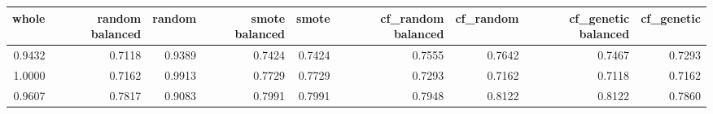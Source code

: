 \begin{tabular}{rrrrrrrrr}
\toprule

 whole &  random balanced &  random &  smote balanced &  smote &  cf\_random balanced &  cf\_random &  cf\_genetic balanced &  cf\_genetic \\
\midrule

0.9432 &           0.7118 &  0.9389 &          0.7424 & 0.7424 &              0.7555 &     0.7642 &               0.7467 &      0.7293 \\
1.0000 &           0.7162 &  0.9913 &          0.7729 & 0.7729 &              0.7293 &     0.7162 &               0.7118 &      0.7162 \\
0.9607 &           0.7817 &  0.9083 &          0.7991 & 0.7991 &              0.7948 &     0.8122 &               0.8122 &      0.7860 \\

\bottomrule
\end{tabular}
